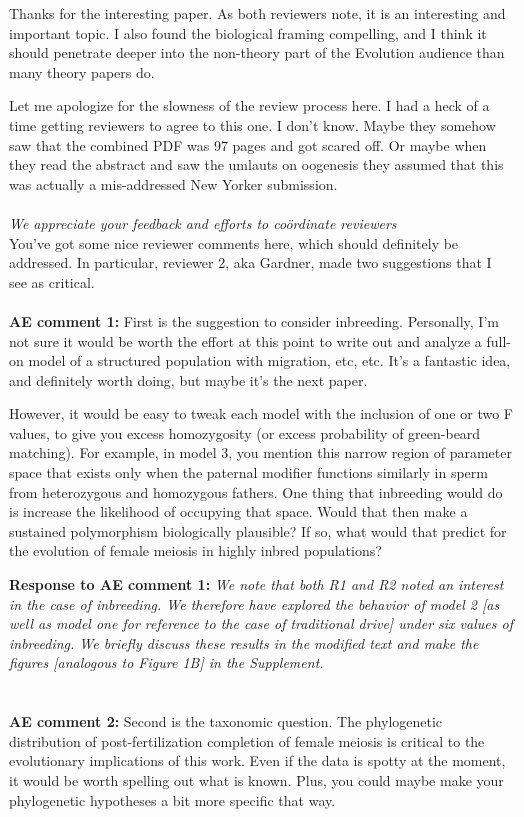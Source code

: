 \documentclass[12pt,letterpaper]{article}
\newcommand{\yb}[1]{{ \color{blue} #1}}
\begin{document}
Thanks for the interesting paper. As both reviewers note, it is an interesting and important topic. I also found the biological framing compelling, and I think it should penetrate deeper into the non-theory part of the Evolution audience than many theory papers do.

Let me apologize for the slowness of the review process here. I had a heck of a time getting reviewers to agree to this one. I don't know. Maybe they somehow saw that the combined PDF was 97 pages and got scared off. Or maybe when they read the abstract and saw the umlauts on oogenesis they assumed that this was actually a mis-addressed New Yorker submission.
\\ \\
\emph{We appreciate your feedback and efforts to co\"{o}rdinate reviewers}
\\

You've got some nice reviewer comments here, which should definitely be addressed. In particular, reviewer 2, aka Gardner, made two suggestions that I see as critical.
\\ \\
{\bf{AE comment 1:}} First is the suggestion to consider inbreeding. Personally, I'm not sure it would be worth the effort at this point to write out and analyze a full-on model of a structured population with migration, etc, etc. It's a fantastic idea, and definitely worth doing, but maybe it's the next paper.

However, it would be easy to tweak each model with the inclusion of one or two F values, to give you excess homozygosity (or excess probability of green-beard matching). For example, in model 3, you mention this narrow region of parameter space that exists only when the paternal modifier functions similarly in sperm from heterozygous and homozygous fathers. One thing that inbreeding would do is increase the likelihood of occupying that space. Would that then make a sustained polymorphism biologically plausible? If so, what would that predict for the evolution of female meiosis in highly inbred populations?

{\bf{Response to AE comment 1:}}  \emph{We note that both R1 and R2 noted an interest in the case of inbreeding. \yb{We therefore have explored the behavior of model 2 [as well as model one for reference to the case of traditional drive] under six values of inbreeding. We briefly discuss these results in the modified text and make the figures [analogous to Figure 1B] in the Supplement.}}
\\
\\
\\
{\bf{AE comment 2:}} Second is the taxonomic question. The phylogenetic distribution of post-fertilization completion of female meiosis is critical to the evolutionary implications of this work. Even if the data is spotty at the moment, it would be worth spelling out what is known. Plus, you could maybe make your phylogenetic hypotheses a bit more specific that way.
\end{document}
